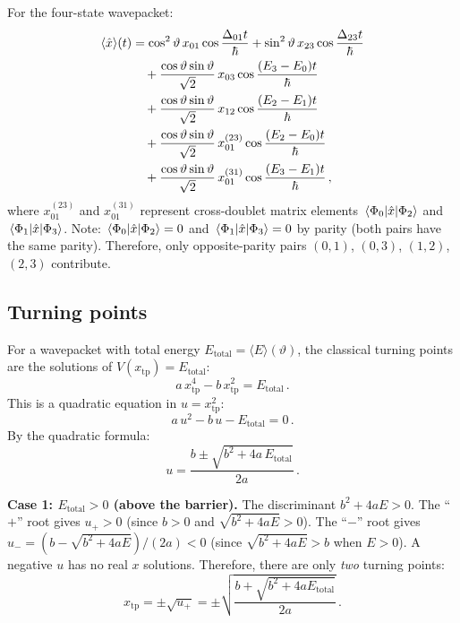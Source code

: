 For the four-state wavepacket:
\begin{align}
  \langle\hat{x}\rangle(t)
  &= \cos^2\vartheta\,x_{01}\cos\frac{\Delta_{01}t}{\hbar}
  + \sin^2\vartheta\,x_{23}\cos\frac{\Delta_{23}t}{\hbar}\notag\\
  &\quad + \frac{\cos\vartheta\sin\vartheta}{\sqrt{2}}\,x_{03}\cos\frac{(E_3-E_0)t}{\hbar}\notag\\
  &\quad + \frac{\cos\vartheta\sin\vartheta}{\sqrt{2}}\,x_{12}\cos\frac{(E_2-E_1)t}{\hbar}\notag\\
  &\quad + \frac{\cos\vartheta\sin\vartheta}{\sqrt{2}}\,x_{01}^{(23)}\cos\frac{(E_2-E_0)t}{\hbar}\notag\\
  &\quad + \frac{\cos\vartheta\sin\vartheta}{\sqrt{2}}\,x_{01}^{(31)}\cos\frac{(E_3-E_1)t}{\hbar}\,,
\end{align}
where $x_{01}^{(23)}$ and $x_{01}^{(31)}$ represent cross-doublet matrix elements
$\mel{\Phi_0}{\hat{x}}{\Phi_2}$ and $\mel{\Phi_1}{\hat{x}}{\Phi_3}$.
Note: $\mel{\Phi_0}{\hat{x}}{\Phi_2} = 0$ and $\mel{\Phi_1}{\hat{x}}{\Phi_3} = 0$
by parity (both pairs have the same parity). Therefore, only opposite-parity pairs
$(0,1)$, $(0,3)$, $(1,2)$, $(2,3)$ contribute.

\subsection{Turning points}\label{sec:turning_points}

For a wavepacket with total energy $E_{\text{total}} = \langle E\rangle(\vartheta)$,
the classical turning points are the solutions of $V(x_{\text{tp}}) = E_{\text{total}}$:
\begin{equation}
  a\,x_{\text{tp}}^4 - b\,x_{\text{tp}}^2 = E_{\text{total}}\,.
\end{equation}
This is a quadratic equation in $u = x_{\text{tp}}^2$:
\begin{equation}
  a\,u^2 - b\,u - E_{\text{total}} = 0\,.
\end{equation}
By the quadratic formula:
\begin{equation}
  u = \frac{b \pm \sqrt{b^2 + 4a\,E_{\text{total}}}}{2a}\,.
\end{equation}

\textbf{Case 1: $E_{\text{total}} > 0$ (above the barrier).}
The discriminant $b^2 + 4aE > 0$. The ``$+$'' root gives $u_+ > 0$ (since $b > 0$
and $\sqrt{b^2+4aE} > 0$). The ``$-$'' root gives $u_- = (b - \sqrt{b^2+4aE})/(2a) < 0$
(since $\sqrt{b^2+4aE} > b$ when $E > 0$). A negative $u$ has no real $x$ solutions.
Therefore, there are only \emph{two} turning points:
\begin{equation}
  x_{\text{tp}} = \pm\sqrt{u_+} = \pm\sqrt{\frac{b+\sqrt{b^2+4aE_{\text{total}}}}{2a}}\,.
\end{equation}

